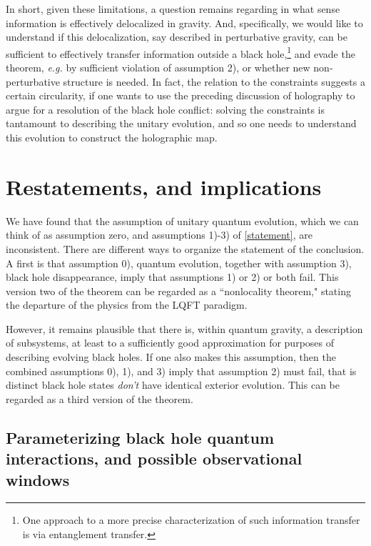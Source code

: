 \documentclass[12pt]{article}
\numberwithin{equation}{section}
\begin{document}
In short, given these limitations, a question remains regarding in what sense information is effectively delocalized in gravity.  And, specifically, we would like to understand if this delocalization, say described in perturbative gravity, can be sufficient to effectively transfer  information outside a black hole,\footnote{One approach to a more precise characterization of such information transfer is via entanglement transfer\cite{GiSh1,Sussxfer}.}
and evade the theorem, {\it e.g.} by sufficient violation of assumption 2), or whether new non-perturbative structure is needed.  In fact, the relation to the constraints suggests a certain circularity, if one wants to use the preceding discussion of holography to argue for a resolution of the black hole conflict: solving the constraints is tantamount to describing the unitary evolution, and so one needs to understand this evolution to construct the holographic map\cite{HoUn}.

\section{Restatements, and implications}

We have found that the assumption of unitary quantum evolution, which we can think of as assumption zero, and assumptions 1)-3) of 
\ref{statement}, are inconsistent.  There are different ways to organize the statement of the conclusion.  A first is that assumption 0), quantum evolution, together with assumption 3), black hole disappearance, imply that assumptions 1) or 2) or both fail.  This version two of the theorem 
can be regarded as a ``nonlocality theorem," stating the departure of the physics from the LQFT paradigm.

However, it remains plausible that there is, within quantum gravity, a description of subsystems, at least to a sufficiently good approximation for purposes of describing evolving black holes.  If one also makes this assumption, then the combined assumptions 0), 1), and 3) imply that assumption 2) must fail, that is distinct black hole states {\it don't} have identical exterior evolution.  This can be regarded as a third version of the theorem.

\subsection{Parameterizing black hole quantum interactions, and possible observational windows}
\end{document}
